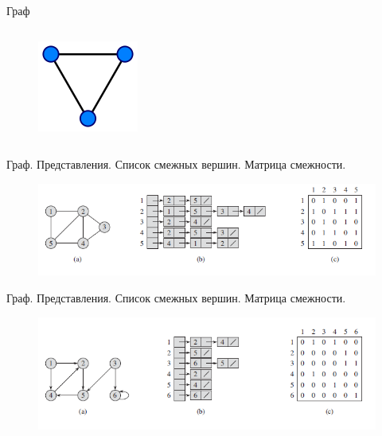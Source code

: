 \documentclass[10pt]{beamer}
\begin{document}
\begin{frame}{Граф}
\begin{columns}
\begin{column}{.3\linewidth}
\begin{figure}
		\centerline{\includegraphics[width=1.0\linewidth]{images/d_graph.png}}
		\end{figure}
	\end{column}
\end{columns}
\end{frame}

\begin{frame}{Граф. Представления. Список смежных вершин. Матрица смежности.}
\begin{figure}
\centerline{\includegraphics[width=1.1\linewidth]{images/graphrep1.png}}
\end{figure}
\end{frame}

\begin{frame}{Граф. Представления. Список смежных вершин. Матрица смежности.}
\begin{figure}
\centerline{\includegraphics[width=1.1\linewidth]{images/graph_rep2.png}}
\end{figure}
\end{frame}
\end{document}
